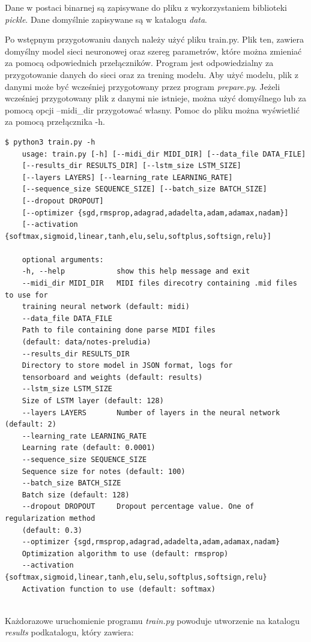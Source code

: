 	Dane w postaci binarnej są zapisywane do pliku z wykorzystaniem biblioteki \textit{pickle}. Dane domyślnie zapisywane są w katalogu \textit{data}.
	
	Po wstępnym przygotowaniu danych należy użyć pliku train.py. Plik ten, zawiera domyślny model sieci neuronowej oraz szereg parametrów, które można zmieniać za pomocą odpowiednich przełączników. Program jest odpowiedzialny za przygotowanie danych do sieci oraz za trening modelu. Aby użyć modelu, plik z danymi może być wcześniej przygotowany przez program \textit{prepare.py}. Jeżeli wcześniej przygotowany plik z danymi nie istnieje, można użyć domyślnego lub za pomocą opcji --midi\_dir przygotować własny. Pomoc do pliku można wyświetlić za pomocą przełącznika -h.	
	
	\begin{lstlisting}[caption={Pomoc do programu train.py},captionpos=b]
	$ python3 train.py -h
	usage: train.py [-h] [--midi_dir MIDI_DIR] [--data_file DATA_FILE]
	[--results_dir RESULTS_DIR] [--lstm_size LSTM_SIZE]
	[--layers LAYERS] [--learning_rate LEARNING_RATE]
	[--sequence_size SEQUENCE_SIZE] [--batch_size BATCH_SIZE]
	[--dropout DROPOUT]
	[--optimizer {sgd,rmsprop,adagrad,adadelta,adam,adamax,nadam}]
	[--activation {softmax,sigmoid,linear,tanh,elu,selu,softplus,softsign,relu}]
	
	optional arguments:
	-h, --help            show this help message and exit
	--midi_dir MIDI_DIR   MIDI files direcotry containing .mid files to use for
	training neural network (default: midi)
	--data_file DATA_FILE
	Path to file containing done parse MIDI files
	(default: data/notes-preludia)
	--results_dir RESULTS_DIR
	Directory to store model in JSON format, logs for
	tensorboard and weights (default: results)
	--lstm_size LSTM_SIZE
	Size of LSTM layer (default: 128)
	--layers LAYERS       Number of layers in the neural network (default: 2)
	--learning_rate LEARNING_RATE
	Learning rate (default: 0.0001)
	--sequence_size SEQUENCE_SIZE
	Sequence size for notes (default: 100)
	--batch_size BATCH_SIZE
	Batch size (default: 128)
	--dropout DROPOUT     Dropout percentage value. One of regularization method
	(default: 0.3)
	--optimizer {sgd,rmsprop,adagrad,adadelta,adam,adamax,nadam}
	Optimization algorithm to use (default: rmsprop)
	--activation {softmax,sigmoid,linear,tanh,elu,selu,softplus,softsign,relu}
	Activation function to use (default: softmax)
	
	\end{lstlisting}
	Każdorazowe uruchomienie programu \textit{train.py} powoduje utworzenie na katalogu \textit{results} podkatalogu, który zawiera:
	
